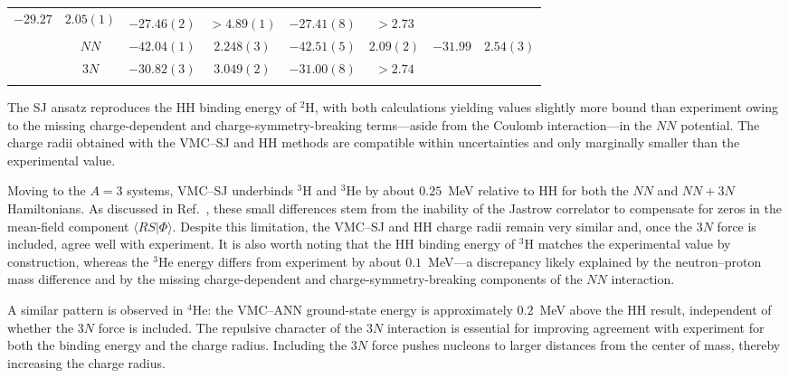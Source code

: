\begin{table}[htb]
\begin{tabular}{c c c c c c c c}
\multirow{2}{*}{$-29.27$} & \multirow{2}{*}{$2.05(1)$}  \\
        & $3N$  & $-27.46(2)$   & $>4.89(1)$ & $-27.41(8)$  & $>2.73$ & &\\
\noalign{\smallskip}\hline\noalign{\smallskip}
\multirow{2}{*}{$^6$Li} & $N\!N$& $-42.04(1)$   & $2.248(3)$ & $-42.51(5)$  & $2.09(2)$ &
\multirow{2}{*}{$-31.99$} & \multirow{2}{*}{$2.54(3)$}  \\
        & $3N$  & $-30.82(3)$   & $3.049(2)$ & $-31.00(8)$  & $>2.74$ & & \\
\noalign{\smallskip}\hline                                                        
\hline
\end{tabular}
\label{tab:afdmc-gfmc}
\end{table}

The SJ ansatz reproduces the HH binding energy of $^2$H, with both calculations yielding values slightly more bound than experiment owing to the missing charge-dependent and charge-symmetry-breaking terms—aside from the Coulomb interaction—in the $NN$ potential. The charge radii obtained with the VMC–SJ and HH methods are compatible within uncertainties and only marginally smaller than the experimental value.

Moving to the $A=3$ systems, VMC–SJ underbinds $^3$H and $^3$He by about $0.25$~MeV relative to HH for both the $NN$ and $NN+3N$ Hamiltonians. As discussed in Ref.~\cite{adams_variational_2021}, these small differences stem from the inability of the Jastrow correlator to compensate for zeros in the mean-field component $\langle RS|\Phi\rangle$. Despite this limitation, the VMC–SJ and HH charge radii remain very similar and, once the $3N$ force is included, agree well with experiment. It is also worth noting that the HH binding energy of $^3$H matches the experimental value by construction, whereas the $^3$He energy differs from experiment by about $0.1$~MeV—a discrepancy likely explained by the neutron–proton mass difference and by the missing charge-dependent and charge-symmetry-breaking components of the $NN$ interaction.

A similar pattern is observed in $^4$He: the VMC–ANN ground-state energy is approximately $0.2$~MeV above the HH result, independent of whether the $3N$ force is included. The repulsive character of the $3N$ interaction is essential for improving agreement with experiment for both the binding energy and the charge radius. Including the $3N$ force pushes nucleons to larger distances from the center of mass, thereby increasing the charge radius.

